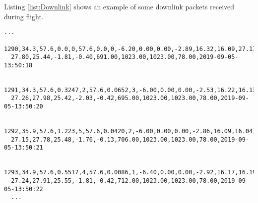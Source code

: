 Listing \ref{list:Downlink} shows an example of some downlink packets received during flight.
\begin{lstlisting}[caption = Sample of downlinked data packets. The line breaks within each packet was not present in the actual data and are shown here to clearly show the packet., label={list:Downlink}]
  ...
  1290,34.3,57.6,0.0,0,57.6,0.0,0,-6.20,0.00,0.00,-2.89,16.32,16.09,27.17,
  27.80,25.44,-1.81,-0.40,691.00,1023.00,1023.00,78.00,2019-09-05-13:50:18
  
  1291,34.3,57.6,0.3247,2,57.6,0.0652,3,-6.00,0.00,0.00,-2.53,16.22,16.13,
  27.26,27.98,25.42,-2.03,-0.42,695.00,1023.00,1023.00,78.00,2019-09-05-13:50:20
  
  1292,35.9,57.6,1.223,5,57.6,0.0420,2,-6.00,0.00,0.00,-2.86,16.09,16.04,
  27.15,27.78,25.48,-1.76,-0.13,706.00,1023.00,1023.00,78.00,2019-09-05-13:50:21
  
  1293,34.9,57.6,0.5517,4,57.6,0.0086,1,-6.40,0.00,0.00,-2.92,16.17,16.19,
  27.24,27.91,25.55,-1.81,-0.42,712.00,1023.00,1023.00,78.00,2019-09-05-13:50:22
  ...
\end{lstlisting}
